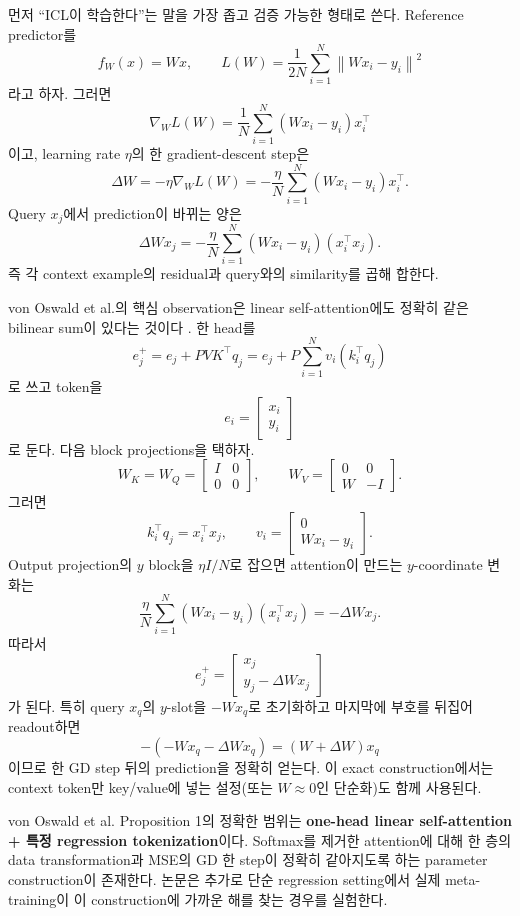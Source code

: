 \documentclass[11pt,a4paper,oneside,openany]{memoir}
\newcommand{\norm}[1]{\left\lVert #1\right\rVert}
\theoremstyle{definition}
\begin{document}
먼저 ``ICL이 학습한다''는 말을 가장 좁고 검증 가능한 형태로 쓴다. Reference predictor를
\[
f_W(x)=Wx,
\qquad
L(W)=\frac{1}{2N}\sum_{i=1}^N\norm{Wx_i-y_i}^2
\]
라고 하자. 그러면
\[
\nabla_WL(W)
=\frac1N\sum_{i=1}^N(Wx_i-y_i)x_i^\top
\]
이고, learning rate $\eta$의 한 gradient-descent step은
\[
\Delta W
=-\eta\nabla_WL(W)
=-\frac{\eta}{N}\sum_{i=1}^N(Wx_i-y_i)x_i^\top.
\]
Query $x_j$에서 prediction이 바뀌는 양은
\[
\Delta W x_j
=-\frac{\eta}{N}\sum_{i=1}^N
(Wx_i-y_i)(x_i^\top x_j).
\]
즉 각 context example의 residual과 query와의 similarity를 곱해 합한다.

von Oswald et al.의 핵심 observation은 linear self-attention에도 정확히 같은 bilinear sum이 있다는 것이다 \cite{vonoswald2023}. 한 head를
\[
e_j^+=e_j+PVK^\top q_j
=e_j+P\sum_{i=1}^Nv_i(k_i^\top q_j)
\]
로 쓰고 token을
\[
e_i=\begin{bmatrix}x_i\\y_i\end{bmatrix}
\]
로 둔다. 다음 block projections을 택하자.
\[
W_K=W_Q=
\begin{bmatrix}I&0\\0&0\end{bmatrix},
\qquad
W_V=
\begin{bmatrix}0&0\\W&-I\end{bmatrix}.
\]
그러면
\[
k_i^\top q_j=x_i^\top x_j,
\qquad
v_i=\begin{bmatrix}0\\Wx_i-y_i\end{bmatrix}.
\]
Output projection의 $y$ block을 $\eta I/N$로 잡으면 attention이 만드는 $y$-coordinate 변화는
\[
\frac{\eta}{N}\sum_{i=1}^N(Wx_i-y_i)(x_i^\top x_j)
=-\Delta W x_j.
\]
따라서
\[
\boxed{
 e_j^+
 =
 \begin{bmatrix}
 x_j\\y_j-\Delta W x_j
 \end{bmatrix}}
\]
가 된다. 특히 query $x_q$의 $y$-slot을 $-Wx_q$로 초기화하고 마지막에 부호를 뒤집어 readout하면
\[
-(-Wx_q-\Delta W x_q)=(W+\Delta W)x_q
\]
이므로 한 GD step 뒤의 prediction을 정확히 얻는다. 이 exact construction에서는 context token만 key/value에 넣는 설정(또는 $W\approx0$인 단순화)도 함께 사용된다.

\begin{paperbox}
von Oswald et al. Proposition 1의 정확한 범위는 \textbf{one-head linear self-attention + 특정 regression tokenization}이다. Softmax를 제거한 attention에 대해 한 층의 data transformation과 MSE의 GD 한 step이 정확히 같아지도록 하는 parameter construction이 존재한다. 논문은 추가로 단순 regression setting에서 실제 meta-training이 이 construction에 가까운 해를 찾는 경우를 실험한다.
\end{paperbox}
\end{document}
